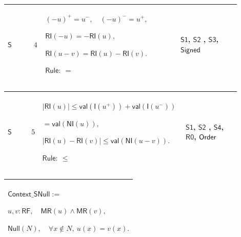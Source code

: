 \documentclass[12pt,reqno]{amsart}
\theoremstyle{blueplain}
\numberwithin{equation}{section}
\newlength{\DCTOneColumnBody}
\begin{document}
{\scriptsize \setlength{\parskip}{0pt}\nointerlineskip
\noindent 
\begin{tabular}{|@{}>{\centering\arraybackslash}m{0.10658\linewidth}|>{\centering\arraybackslash}m{0.03553\linewidth}|>{\centering\arraybackslash}m{0.52105\linewidth}|>{\centering\arraybackslash}m{0.23684\linewidth}|}
\hline
\hypertarget{dct:S4}{$\displaystyle \mathsf{S}$} & $\displaystyle 4$ & $%
\displaystyle (-u)^+=u^-,\quad(-u)^-=u^+,$\par$\displaystyle \mathsf{RI}%
(-u)=-\mathsf{RI}(u),$\par$\displaystyle \mathsf{RI}(u-v)=\mathsf{RI}(u)-%
\mathsf{RI}(v).$\par$\displaystyle \mathsf{Rule}:\ =$ & \hyperlink{dct:S1}{$%
\displaystyle \mathsf{S1}$}, \hyperlink{dct:S2}{$\displaystyle \mathsf{S2}$}%
, \hyperlink{dct:S3}{$\displaystyle \mathsf{S3}$}, \hyperlink{dctdef:Signed}{%
$\displaystyle \mathsf{Signed}$} \\ \hline
\end{tabular}%
}

{\scriptsize \setlength{\parskip}{0pt}\nointerlineskip
\noindent 
\begin{tabular}{|@{}>{\centering\arraybackslash}m{0.10658\linewidth}|>{\centering\arraybackslash}m{0.03553\linewidth}|>{\centering\arraybackslash}m{0.52105\linewidth}|>{\centering\arraybackslash}m{0.23684\linewidth}|}
\hline
\hypertarget{dct:S5}{$\displaystyle \mathsf{S}$} & $\displaystyle 5$ & $%
\displaystyle |\mathsf{RI}(u)|\le\mathsf{val}(\mathsf{I}(u^+))+\mathsf{val}(%
\mathsf{I}(u^-))$\par$\displaystyle {}=\mathsf{val}(\mathsf{NI}(u)),$\par$%
\displaystyle |\mathsf{RI}(u)-\mathsf{RI}(v)|\le\mathsf{val}(\mathsf{NI}%
(u-v)).$\par$\displaystyle \mathsf{Rule}:\ \le$ & \hyperlink{dct:S1}{$%
\displaystyle \mathsf{S1}$}, \hyperlink{dct:S2}{$\displaystyle \mathsf{S2}$}%
, \hyperlink{dct:S4}{$\displaystyle \mathsf{S4}$}, \hyperlink{dct:R0}{$%
\displaystyle \mathsf{R0}$}, \hyperlink{ax:Order}{$\displaystyle \mathsf{%
Order}$} \\ \hline
\end{tabular}%
}

{\scriptsize \setlength{\parskip}{0pt}\nointerlineskip
\noindent 
\begin{tabular}{|@{}>{\centering\arraybackslash}m{\DCTOneColumnBody}|}
\hline
$\displaystyle \mathsf{Context\_SNull}:=$\par$\displaystyle u,v:\mathsf{RF}%
,\quad\mathsf{MR}(u)\land\mathsf{MR}(v),$\par$\displaystyle \mathsf{Null}%
(N),\quad\forall x\notin N,\ u(x)=v(x).$ \\ \hline
\end{tabular}%
}
\end{document}
